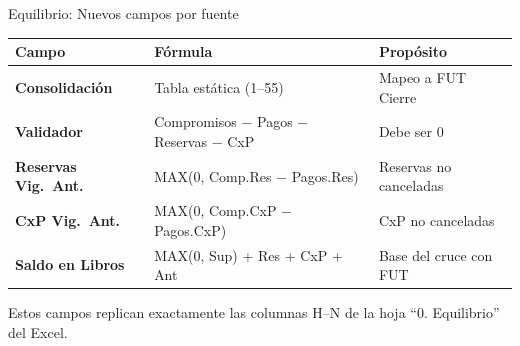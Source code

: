 \documentclass[aspectratio=169,12pt]{beamer}
\begin{document}
\begin{frame}{Equilibrio: Nuevos campos por fuente}

\small
\begin{center}
\renewcommand{\arraystretch}{1.3}
\begin{tabular}{>{\bfseries}l l l}
\toprule
\textbf{Campo} & \textbf{F\'ormula} & \textbf{Prop\'osito} \\
\midrule
Consolidaci\'on & Tabla est\'atica (1--55) & Mapeo a FUT Cierre \\
Validador & Compromisos $-$ Pagos $-$ Reservas $-$ CxP & Debe ser 0 \\
Reservas Vig.~Ant. & MAX(0, Comp.Res $-$ Pagos.Res) & Reservas no canceladas \\
CxP Vig.~Ant. & MAX(0, Comp.CxP $-$ Pagos.CxP) & CxP no canceladas \\
Saldo en Libros & MAX(0, Sup) + Res + CxP + Ant & Base del cruce con FUT \\
\bottomrule
\end{tabular}
\end{center}

\vspace{10pt}
\textcolor{sepia}{\small Estos campos replican exactamente las columnas H--N de la hoja ``0. Equilibrio'' del Excel.}
\end{frame}
\end{document}
